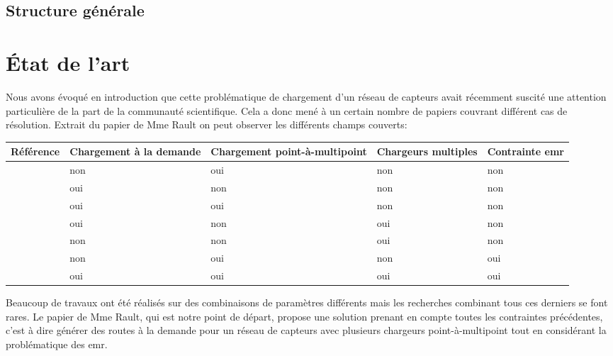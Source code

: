 \documentclass[noposter]{polytech}
\begin{document}
	
	\section{Structure générale} %
	

\chapter{État de l'art}
	Nous avons évoqué en introduction que cette problématique de chargement d'un réseau de capteurs avait récemment suscité une attention particulière de la part de la communauté scientifique.
	Cela a donc mené à un certain nombre de papiers couvrant différent cas de résolution.
	Extrait du papier de Mme Rault \cite{Rault:chargers} on peut observer les différents champs couverts:
	
	\begin{center}
		\centering
		\begin{tabularx}{\textwidth}{|c||X|X|X|X|}
			\hline
			Référence & Chargement à la demande & Chargement point-à-multipoint & Chargeurs multiples & Contrainte \gls{emr}\\\hline\hline
			\cite{6275766} \cite{LIN2016381} & non & oui & non & non\\\hline
			\cite{6911792} \cite{1999253} & oui & non & non & non\\\hline
			\cite{KHELLADI201744} & oui & oui & non & non\\\hline
			\cite{LIN201688} \cite{Madhja2015} \cite{wang2013multi} \cite{Jiang2014} & oui & non & oui & non\\\hline
			\cite{7889006} & non & non & oui & non\\\hline
			\cite{NIKOLETSEAS20171} \cite{8051273} \cite{6888920} \cite{7524385} & non & oui & non & oui\\\hline\hline
			\rowcolor{polytechlightblue}
			\cite{Rault:chargers} & oui & oui & oui & oui\\\hline
		\end{tabularx}	
	\end{center}
	
	Beaucoup de travaux ont été réalisés sur des combinaisons de paramètres différents mais les recherches combinant tous ces derniers se font rares.
	Le papier de Mme Rault, qui est notre point de départ, propose une solution prenant en compte toutes les contraintes précédentes, c'est à dire générer des routes à la demande pour un réseau de capteurs avec plusieurs chargeurs point-à-multipoint tout en considérant la problématique des \gls{emr}.
\end{document}
